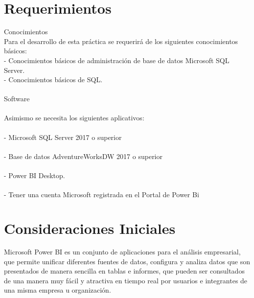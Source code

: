 \documentclass[12pt,letterpaper]{article}
\begin{document}
\section{Requerimientos}
Conocimientos
\\Para el desarrollo de esta práctica se requerirá de los siguientes conocimientos básicos:
\\- Conocimientos básicos de administración de base de datos Microsoft SQL Server.
\\- Conocimientos básicos de SQL.
\\\\Software
\\\\Asimismo se necesita los siguientes aplicativos:
\\\\- Microsoft SQL Server 2017 o superior
\\\\- Base de datos AdventureWorksDW 2017 o superior
\\\\- Power BI Desktop.
\\\\- Tener una cuenta Microsoft registrada en el Portal de Power Bi 

\section{Consideraciones Iniciales}
Microsoft Power BI es un conjunto de aplicaciones para el análisis empresarial, que permite unificar diferentes
fuentes de datos, configura y analiza datos que son presentados de manera sencilla en tablas e informes, que
pueden ser consultados de una manera muy fácil y atractiva en tiempo real por usuarios e integrantes de una
misma empresa u organización.
\end{document}

